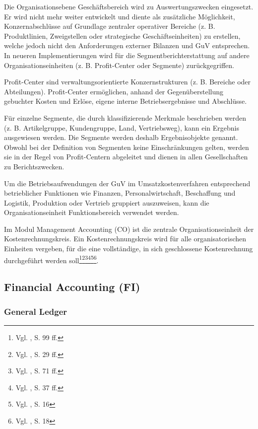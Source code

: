 Die Organisationsebene Geschäftsbereich wird zu Auswertungszwecken eingesetzt. Er wird nicht mehr weiter entwickelt und diente als zusätzliche Möglichkeit, Konzernabschlüsse auf Grundlage zentraler operativer Bereiche (z. B. Produktlinien, Zweigstellen oder strategische Geschäftseinheiten) zu erstellen, welche jedoch nicht den Anforderungen externer Bilanzen und GuV entsprechen. In neueren Implementierungen wird für die Segmentberichterstattung auf andere Organisationseinheiten (z. B. Profit-Center oder Segmente) zurückgegriffen.

Profit-Center sind verwaltungsorientierte Konzernstrukturen (z. B. Bereiche oder Abteilungen). Profit-Center ermöglichen, anhand der Gegenüberstellung gebuchter Kosten und Erlöse, eigene interne Betriebsergebnisse und Abschlüsse.

Für einzelne Segmente, die durch klassifizierende Merkmale beschrieben werden (z. B. Artikelgruppe, Kundengruppe, Land, Vertriebsweg), kann ein Ergebnis ausgewiesen werden. Die Segmente werden deshalb Ergebnisobjekte genannt. Obwohl bei der Definition von Segmenten keine Einschränkungen gelten, werden sie in der Regel von Profit-Centern abgeleitet und dienen in allen Gesellschaften zu Berichtszwecken. 

Um die Betriebsaufwendungen der GuV im Umsatzkostenverfahren entsprechend betrieblicher Funktionen wie Finanzen, Personalwirtschaft, Beschaffung und Logistik, Produktion oder Vertrieb gruppiert auszuweisen, kann die Organisationseinheit Funktionsbereich verwendet werden.

Im Modul Management Accounting (CO) ist die zentrale Organisationseinheit der Kostenrechnungskreis. Ein Kostenrechnungskreis wird für alle organisatorischen Einheiten vergeben, für die eine vollständige, in sich geschlossene Kostenrechnung durchgeführt werden soll\footnote{Vgl. \cite{Hefner2001}, S. 99 ff.}\footnote{Vgl. \cite{Friedl2008}, S. 29 ff.}\footnote{Vgl. \cite{Maassen2006}, S. 71 ff.}\footnote{Vgl. \cite{Patel2009}, S. 37 ff.}\footnote{Vgl. \cite{Padhi2011}, S. 16}\footnote{Vgl. \cite{SAPFI2001}, S. 18}.







\subsection{Financial Accounting (FI)} %
\subsubsection{General Ledger} %
